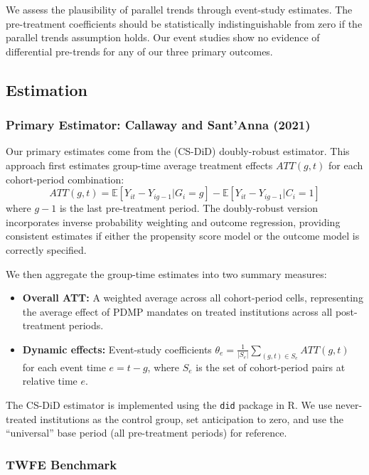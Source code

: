 \documentclass[12pt]{article}
\newcommand{\E}{\mathbb{E}}
\begin{document}
We assess the plausibility of parallel trends through event-study estimates. The pre-treatment coefficients should be statistically indistinguishable from zero if the parallel trends assumption holds. Our event studies show no evidence of differential pre-trends for any of our three primary outcomes.

\subsection{Estimation}

\subsubsection{Primary Estimator: Callaway and Sant'Anna (2021)}

Our primary estimates come from the \citet{callaway2021difference} (CS-DiD) doubly-robust estimator. This approach first estimates group-time average treatment effects $ATT(g,t)$ for each cohort-period combination:
\begin{equation}
ATT(g,t) = \E[Y_{it} - Y_{ig-1} | G_i = g] - \E[Y_{it} - Y_{ig-1} | C_i = 1]
\end{equation}
where $g-1$ is the last pre-treatment period. The doubly-robust version incorporates inverse probability weighting and outcome regression, providing consistent estimates if either the propensity score model or the outcome model is correctly specified.

We then aggregate the group-time estimates into two summary measures:
\begin{itemize}
\item \textbf{Overall ATT:} A weighted average across all cohort-period cells, representing the average effect of PDMP mandates on treated institutions across all post-treatment periods.
\item \textbf{Dynamic effects:} Event-study coefficients $\theta_e = \frac{1}{|S_e|} \sum_{(g,t) \in S_e} ATT(g,t)$ for each event time $e = t - g$, where $S_e$ is the set of cohort-period pairs at relative time $e$.
\end{itemize}

The CS-DiD estimator is implemented using the \texttt{did} package in R. We use never-treated institutions as the control group, set anticipation to zero, and use the ``universal'' base period (all pre-treatment periods) for reference.

\subsubsection{TWFE Benchmark}
\end{document}
